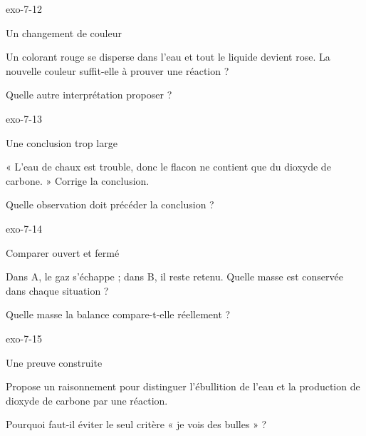 \documentclass[12pt,twoside,openany]{book}
\begin{document}
\begin{blocLivre}{exo-7-12}
\begin{exercice}[3]{Un changement de couleur}
\begin{questions}
\item Un colorant rouge se disperse dans l’eau et tout le liquide devient rose. La nouvelle couleur suffit-elle à prouver une réaction ?
\item Quelle autre interprétation proposer ?
\end{questions}
\end{exercice}\end{blocLivre}
\begin{blocLivre}{exo-7-13}
\begin{exercice}[3]{Une conclusion trop large}
\begin{questions}
\item « L’eau de chaux est trouble, donc le flacon ne contient que du dioxyde de carbone. » Corrige la conclusion.
\item Quelle observation doit précéder la conclusion ?
\end{questions}
\end{exercice}\end{blocLivre}
\begin{blocLivre}{exo-7-14}
\begin{exercice}[3]{Comparer ouvert et fermé}
\begin{questions}
\item Dans A, le gaz s’échappe ; dans B, il reste retenu. Quelle masse est conservée dans chaque situation ?
\item Quelle masse la balance compare-t-elle réellement ?
\end{questions}
\end{exercice}\end{blocLivre}
\begin{blocLivre}{exo-7-15}
\begin{exercice}[3]{Une preuve construite}
\begin{questions}
\item Propose un raisonnement pour distinguer l’ébullition de l’eau et la production de dioxyde de carbone par une réaction.
\item Pourquoi faut-il éviter le seul critère « je vois des bulles » ?
\end{questions}
\end{exercice}\end{blocLivre}
\end{document}
